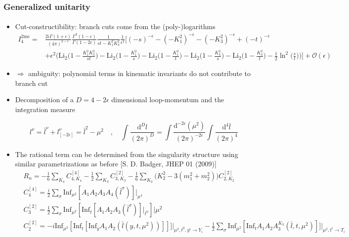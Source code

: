 \documentclass[english]{beamer}
\newcommand{\dd}{\textrm{d}}
\newcommand{\Inf}{\mathrm{Inf}}
\newcommand{\dilog}{\mathrm{Li}_2}
\begin{document}
\begin{frame}[shrink=20]
\begin{itemize}
\end{itemize}

\end{frame}
\begin{frame}[shrink=20]
\frametitle{Generalized unitarity}
\framesubtitle{}
\begin{itemize}
\item<1-> Cut-constructibility: branch cuts come from the (poly-)logarithms
\tiny
\begin{equation*}
\begin{split}
I^{\mathrm{2me}}_4 = &\frac{2i\Gamma(1+\epsilon)}{(4\pi)^{2-\epsilon}}\frac{ \Gamma^2(1-\epsilon)}{\Gamma(1-2\epsilon)}\frac{1}{st-K_1^2K_3^2}\frac{1}{\epsilon^2}
\Big[
(-s)^{-\epsilon} - (-K_1^2)^{-\epsilon} - (-K_3^2)^{-\epsilon} + (-t)^{-\epsilon}
\\&
+\epsilon^2\Big(
\dilog\big(1-\frac{K_1^2K_3^2}{st}\big) 
-\dilog\big(1-\frac{K_1^2}{s}\big) 
-\dilog\big(1-\frac{K_1^2}{t}\big) 
-\dilog\big(1-\frac{K_3^2}{s}\big) 
-\dilog\big(1-\frac{K_3^2}{t}\big) 
-\frac{1}{2}\ln^2\big(\frac{s}{t}\big)
\Big)
\Big]
+\mathcal{O}(\epsilon)
\end{split}
\end{equation*}
\normalsize
\item<2->[]
$\Rightarrow$ ambiguity: polynomial terms in kinematic invariants do not contribute to branch cut

\item<3-> Decomposition of a $D=4-2\epsilon$ dimensional loop-momentum and the integration measure

\begin{equation*}
l^\nu = \bar{l}^\nu + l_{[-2\epsilon]}^\nu = \bar{l}^2 - \mu^2
\quad,\quad
\int\frac{\dd^D l}{(2\pi)^D} = 
\int\frac{\dd^{-2\epsilon}(\mu^2)}{(2\pi)^{-2\epsilon}}\int\frac{\dd^4 \bar{l}}{(2\pi)^4}
\end{equation*}

\item<4-> The rational term can be determined from the singularity structure using similar parametrizations as before
\tiny\color{blue}
[S. D. Badger, JHEP 01 (2009)]
\color{black}\small
\begin{equation*}
\begin{split}
& R_n = -\frac{1}{6}\sum_{K_4}C_{4,K_4}^{[4]} - \frac{1}{2}\sum_{K_3}C_{3,K_3}^{[2]} - 
\frac{1}{6}\sum_{K_2}\big(K_2^2 - 3(m_1^2 + m_2^2)\big)C_{2,K_2}^{[2]}
\\
& C_4^{[4]} = \frac{i}{2}\sum_{\sigma}\Inf_{\mu^2}[A_1A_2A_3A_4(\bar{l}^\sigma)]\big|_{\mu^4}
\\
& C_3^{[2]} = \frac{1}{2}\sum_\sigma\Inf_{\mu^2}[\Inf_t[A_1A_2A_3(\bar{l}^\sigma)]\big|_{t^0}]\big|{\mu^2}
\\
& C_2^{[2]} = -i\Inf_{\mu^2}[\Inf_t[\Inf_y A_1 A_2(\bar{l}(y,t,\mu^2))]]]\big|_{\mu^2,t^0,y^i\rightarrow Y_i} -\frac{1}{2}\sum_{\sigma}\Inf_{\mu^2}[\Inf_tA_1A_2A_3^{K_3}(\bar{l}, t, \mu^2)]]\big|_{\mu^2,t^i\rightarrow T_i}
\end{split}
\end{equation*}

\end{itemize}

\end{frame}
\end{document}
